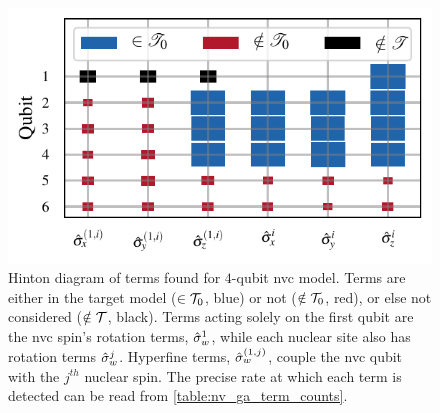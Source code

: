 \begin{figure}
    \begin{center}
        \includegraphics{experimental_study/figures/nv_gen_alg_hinton.pdf}
    \end{center}
    \caption[Hinton diagram of terms found for $4$-qubit nitrogen-vacancy centre model]{
        Hinton diagram of terms found for $4$-qubit \acrlong{nvc} model.
        Terms are either in the target model ($\in \mathcal{T}_0$, blue) or not ($\notin \mathcal{T}_0$, red), 
        or else not considered ($\notin \mathcal{T}$, black). 
        Terms acting solely on the first qubit are the \gls{nvc} spin's rotation terms, $\hat{\sigma}_w^1$,
            while each nuclear site also has rotation terms $\hat{\sigma}_w^j$.
            Hyperfine terms, $\hat{\sigma}_w^{(1,j)}$, couple the \gls{nvc} qubit with the $j^{th}$ nuclear spin. 
            The precise rate at which each term is detected can be read from \cref{table:nv_ga_term_counts}. 
        }
    \label{fig:nv_ga_hinton}
\end{figure}

\begin{table}
    \begin{center}
        
    \end{center}
    \caption[Percentage of instances for which each term is found by QMLA genetic algorithm studying nitrogen-vacancy centre system]{
        Percentage of \glspl{instance} for which each term is found by \gls{qmla} \gls{ga} studying \gls{nvc} system.
    }
    \label{table:nv_ga_term_counts}
\end{table}